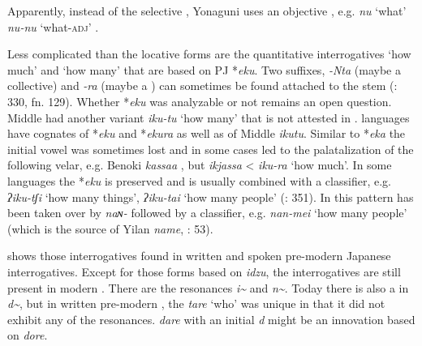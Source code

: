 Apparently, instead of the selective , Yonaguni uses an objective , e.g.  \textit{nu} ‘what’ \textit{nu-nu} ‘what-\textsc{adj}’ \citep[431]{Izuyama2012}.

Less complicated than the locative forms are the quantitative interrogatives ‘how much’ and ‘how many’ that are based on PJ *\textit{eku}. Two suffixes, \textit{-Nta} (maybe a collective) and \textit{-ra} (maybe a ) can sometimes be found attached to the stem (\citealt{Vovin2005}: 330, fn. 129). Whether *\textit{eku} was analyzable or not remains an open question. Middle  had another variant \textit{iku-tu} ‘how many’ that is not attested in .   languages have cognates of  *\textit{eku} and *\textit{ekura} as well as of Middle  \textit{ikutu}. Similar to *\textit{eka} the initial vowel was sometimes lost and in some cases led to the palatalization of the following velar, e.g. Benoki \textit{kassaa} \citep[332]{Vovin2005}, but  \textit{ikjassa} \citep[51]{Niinaga2010} < \textit{iku-ra} ‘how much’. In some languages the  *\textit{eku} is preserved and is usually combined with a classifier, e.g.  \textit{ʔiku-tʃi} ‘how many things’, \textit{ʔiku-tai} ‘how many people’ (\citealt{vanderLubbeTokunaga2015}: 351). In  this pattern has been taken over by \textit{naɴ-} followed by a classifier, e.g. \textit{nan-mei}  ‘how many people’ (which is the source of Yilan \textit{name}, \citealt{Peng2015}: 53).

 shows those interrogatives found in written and spoken pre-modern {Jap\-a\-nese} interrogatives. Except for those forms based on \textit{idzu}, the interrogatives are still present in modern . There are the resonances \textit{i{\textasciitilde}} and \textit{n{\textasciitilde}}. Today there is also a  in \textit{d{\textasciitilde}}, but in written pre-modern , the  \textit{tare} ‘who’ was unique in that it did not exhibit any of the resonances.  \textit{dare} with an initial \textit{d} might be an innovation based on \textit{dore}.


